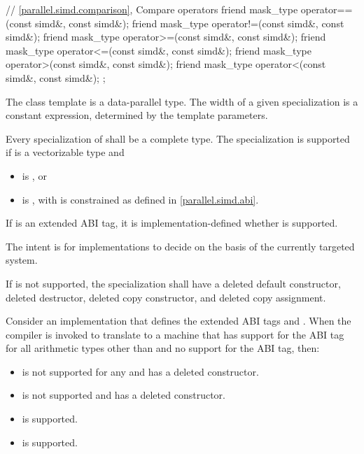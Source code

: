 \begin{codeblock}
{  // \ref{parallel.simd.comparison}, Compare operators
  friend mask_type operator==(const simd&, const simd&);
  friend mask_type operator!=(const simd&, const simd&);
  friend mask_type operator>=(const simd&, const simd&);
  friend mask_type operator<=(const simd&, const simd&);
  friend mask_type operator>(const simd&, const simd&);
  friend mask_type operator<(const simd&, const simd&);
};
\end{codeblock}

\pnum
The class template  is a data-parallel type. The width of a given  specialization is a constant expression, determined by the template parameters.

\pnum
Every specialization of  shall be a complete type. The specialization  is supported if  is a vectorizable type and
\begin{itemize}
  \item {} is , or
  \item {} is , with  is constrained as defined in \ref{parallel.simd.abi}.
\end{itemize}

If  is an extended ABI tag, it is implementation-defined whether  is supported. \begin{note}The intent is for implementations to decide on the basis of the currently targeted system.\end{note}

If  is not supported, the specialization shall have a deleted default constructor, deleted destructor, deleted copy constructor, and deleted copy assignment.

\begin{example}
  Consider an implementation that defines the extended ABI tags  and . When the compiler is invoked to translate to a machine that has support for the  ABI tag for all arithmetic types other than  and no support for the  ABI tag, then:
  \begin{itemize}
    \item {} is not supported for any  and has a deleted constructor.
    \item {} is not supported and has a deleted constructor.
    \item {} is supported.
    \item {} is supported.
  \end{itemize}
\end{example}

